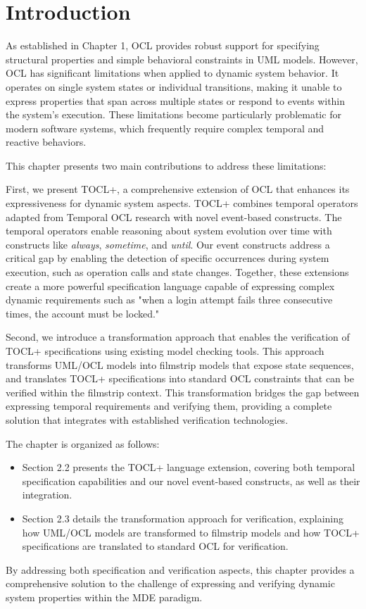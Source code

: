 \section{Introduction}

As established in Chapter 1, OCL provides robust support for specifying structural properties 
and simple behavioral constraints in UML models. However, OCL has significant limitations 
when applied to dynamic system behavior. It operates on single system states or individual 
transitions, making it unable to express properties that span across multiple states or 
respond to events within the system's execution. These limitations become particularly 
problematic for modern software systems, which frequently require complex temporal and 
reactive behaviors.

This chapter presents two main contributions to address these limitations:

First, we present TOCL+, a comprehensive extension of OCL that enhances its expressiveness 
for dynamic system aspects. TOCL+ combines temporal operators adapted from Temporal OCL 
research with novel event-based constructs. The temporal operators enable reasoning about 
system evolution over time with constructs like \textit{always}, \textit{sometime}, and 
\textit{until}. Our event constructs address a critical gap by enabling the detection of 
specific occurrences during system execution, such as operation calls and state changes. 
Together, these extensions create a more powerful specification language capable of expressing 
complex dynamic requirements such as "when a login attempt fails three consecutive times, 
the account must be locked."

Second, we introduce a transformation approach that enables the verification of TOCL+ 
specifications using existing model checking tools. This approach transforms UML/OCL models 
into filmstrip models that expose state sequences, and translates TOCL+ specifications into 
standard OCL constraints that can be verified within the filmstrip context. This transformation 
bridges the gap between expressing temporal requirements and verifying them, providing a 
complete solution that integrates with established verification technologies.

The chapter is organized as follows:
\begin{itemize}
    \item Section 2.2 presents the TOCL+ language extension, covering both temporal 
    specification capabilities and our novel event-based constructs, as well as their 
    integration.
    
    \item Section 2.3 details the transformation approach for verification, explaining 
    how UML/OCL models are transformed to filmstrip models and how TOCL+ specifications 
    are translated to standard OCL for verification.
\end{itemize}

By addressing both specification and verification aspects, this chapter provides a 
comprehensive solution to the challenge of expressing and verifying dynamic system properties 
within the MDE paradigm.